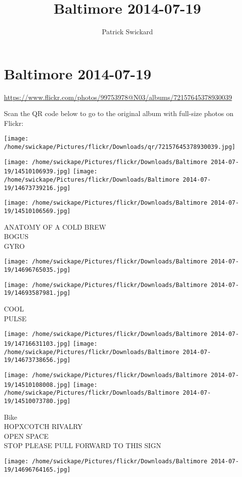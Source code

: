 \documentclass[10pt,letterpaper]{article}
\title{Baltimore 2014-07-19}
\author{Patrick Swickard}
\date{}
\begin{document}
\section*{Baltimore 2014-07-19}

\url{https://www.flickr.com/photos/99753978@N03/albums/72157645378930039}

Scan the QR code below to go to the original album with full-size photos on Flickr:

\texttt{[image: /home/swickape/Pictures/flickr/Downloads/qr/72157645378930039.jpg]}
\pagebreak

\texttt{[image: /home/swickape/Pictures/flickr/Downloads/Baltimore 2014-07-19/14510106939.jpg]}
\texttt{[image: /home/swickape/Pictures/flickr/Downloads/Baltimore 2014-07-19/14673739216.jpg]}

\vspace{0.25in}
\texttt{[image: /home/swickape/Pictures/flickr/Downloads/Baltimore 2014-07-19/14510106569.jpg]}

ANATOMY OF A COLD BREW\\
BOGUS\\
GYRO
\pagebreak

\texttt{[image: /home/swickape/Pictures/flickr/Downloads/Baltimore 2014-07-19/14696765035.jpg]}

\vspace{0.25in}
\texttt{[image: /home/swickape/Pictures/flickr/Downloads/Baltimore 2014-07-19/14693587981.jpg]}

COOL\\
PULSE
\pagebreak

\texttt{[image: /home/swickape/Pictures/flickr/Downloads/Baltimore 2014-07-19/14716631103.jpg]}
\texttt{[image: /home/swickape/Pictures/flickr/Downloads/Baltimore 2014-07-19/14673738656.jpg]}

\texttt{[image: /home/swickape/Pictures/flickr/Downloads/Baltimore 2014-07-19/14510108008.jpg]}
\texttt{[image: /home/swickape/Pictures/flickr/Downloads/Baltimore 2014-07-19/14510073780.jpg]}

Bike\\
HOPXCOTCH RIVALRY\\
OPEN SPACE\\
STOP PLEASE PULL FORWARD TO THIS SIGN
\pagebreak

\texttt{[image: /home/swickape/Pictures/flickr/Downloads/Baltimore 2014-07-19/14696764165.jpg]}
\end{document}
